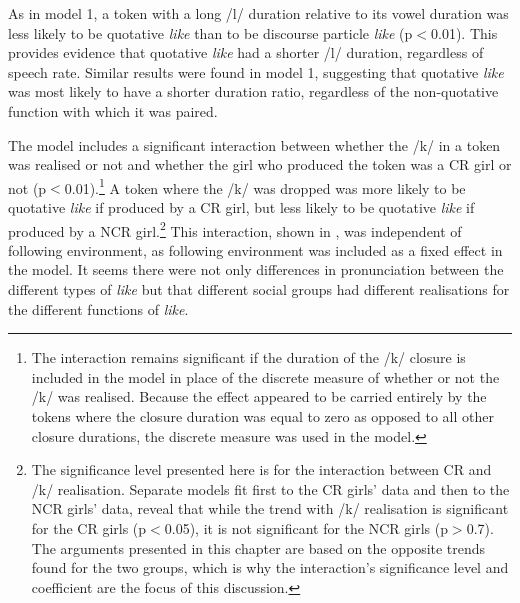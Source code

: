 \largerpage
As in model 1, a token with a long /l/ duration relative to its vowel duration was less likely to be quotative \textit{like} than to be discourse particle \textit{like} (p$<$0.01). This provides evidence that quotative \textit{like} had a shorter /l/ duration, regardless of speech rate. Similar results were found in model 1, suggesting that quotative \textit{like} was most likely to have a shorter duration ratio, regardless of the non-quotative function with which it was paired.


The model includes a significant interaction between whether the /k/ in a token was realised or not and whether the girl who produced the token was a CR girl or not (p$<$0.01).\footnote{The interaction remains significant if the duration of the /k/ closure is included in the model in place of the discrete measure of whether or not the /k/ was realised. Because the effect appeared to be carried entirely by the tokens where the closure duration was equal to zero as opposed to all other closure durations, the discrete measure was used in the model.} A token where the /k/ was dropped was more likely to be quotative \textit{like} if produced by a CR girl, but less likely to be quotative \textit{like} if produced by a NCR girl.\footnote{The significance level presented here is for the interaction between CR and /k/ realisation. Separate models fit first to the CR girls' data and then to the NCR girls' data, reveal that while the trend with /k/ realisation is significant for the CR girls (p$<$0.05), it is not significant for the NCR girls (p$>$0.7). The arguments presented in this chapter are based on the opposite trends found for the two groups, which is why the interaction's significance level and coefficient are the focus of this discussion.} This interaction, shown in , was independent of following environment, as following environment was included as a fixed effect in the model. It seems there were not only differences in pronunciation between the different types of \textit{like} but that different social groups had different realisations for the different functions of \textit{like}. 
